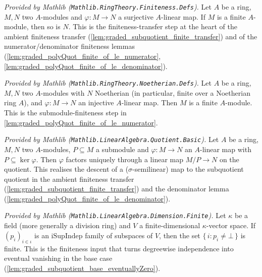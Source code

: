 \begin{lemma}
  \label{lem:module_finite_of_surjective_mathlib}
  \mathlibok
  \textit{Provided by Mathlib (\texttt{Mathlib.RingTheory.Finiteness.Defs}).}
  Let \(A\) be a ring, \(M, N\) two \(A\)-modules and \(\varphi : M \to N\) a
  surjective \(A\)-linear map. If \(M\) is a finite \(A\)-module, then so is \(N\).
  This is the finiteness-transfer step at the heart of the ambient finiteness
  transfer (\cref{lem:graded_subquotient_finite_transfer}) and of the
  numerator/denominator finiteness lemmas
  (\cref{lem:graded_polyQuot_finite_of_le_numerator},
  \cref{lem:graded_polyQuot_finite_of_le_denominator}).
\end{lemma}

\begin{lemma}
  \label{lem:module_finite_of_injective_mathlib}
  \mathlibok
  \textit{Provided by Mathlib (\texttt{Mathlib.RingTheory.Noetherian.Defs}).}
  Let \(A\) be a ring, \(M, N\) two \(A\)-modules with \(N\) Noetherian (in
  particular, finite over a Noetherian ring \(A\)), and \(\varphi : M \to N\) an
  injective \(A\)-linear map. Then \(M\) is a finite \(A\)-module. This is the
  submodule-finiteness step in \cref{lem:graded_polyQuot_finite_of_le_numerator}.
\end{lemma}

\begin{lemma}
  \label{lem:submodule_liftQ_mathlib}
  \mathlibok
  \textit{Provided by Mathlib (\texttt{Mathlib.LinearAlgebra.Quotient.Basic}).}
  Let \(A\) be a ring, \(M, N\) two \(A\)-modules, \(P \subseteq M\) a submodule and
  \(\varphi : M \to N\) an \(A\)-linear map with \(P \subseteq \ker\varphi\). Then
  \(\varphi\) factors uniquely through a linear map \(M/P \to N\) on the quotient.
  This realises the descent of a (\(\sigma\)-semilinear) map to the subquotient
  quotient in the ambient finiteness transfer
  (\cref{lem:graded_subquotient_finite_transfer}) and the denominator lemma
  (\cref{lem:graded_polyQuot_finite_of_le_denominator}).
\end{lemma}

\begin{lemma}
  \label{lem:finite_ne_bot_of_iSupIndep_mathlib}
  \mathlibok
  \textit{Provided by Mathlib
  (\texttt{Mathlib.LinearAlgebra.Dimension.Finite}).}
  Let \(\kappa\) be a field (more generally a division ring) and \(V\) a
  finite-dimensional \(\kappa\)-vector space. If \((p_i)_{i \in \iota}\) is an
  \(\mathrm{iSupIndep}\) family of subspaces of \(V\), then the set
  \(\{\,i : p_i \ne \bot\,\}\) is finite. This is the finiteness input that turns
  degreewise independence into eventual vanishing in the base case
  (\cref{lem:graded_subquotient_base_eventuallyZero}).
\end{lemma}

